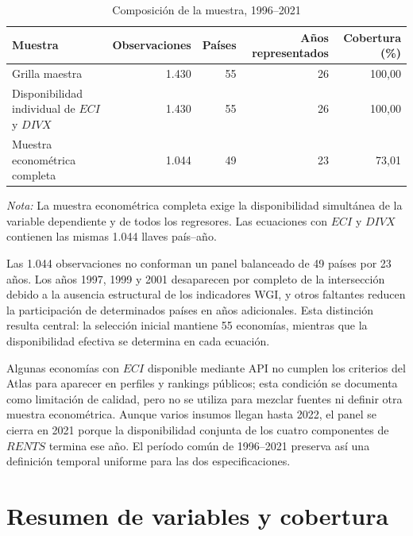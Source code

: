 \documentclass[../../TFM.tex]{subfiles}
\begin{document}
	\begin{table}[htbp]
		\centering
		\caption{Composición de la muestra, 1996--2021}
		\label{tab:composicion-muestra-cap10}
		\begin{minipage}{0.94\textwidth}
			\small
			\begin{tabularx}{\linewidth}{@{}Xrrrr@{}}
				\toprule
				Muestra
				& Observaciones
				& Países
				& Años representados
				& Cobertura (\%) \\
				\midrule
				Grilla maestra
				& 1.430 & 55 & 26 & 100,00 \\
				Disponibilidad individual de $ECI$ y $DIVX$
				& 1.430 & 55 & 26 & 100,00 \\
				Muestra econométrica completa
				& 1.044 & 49 & 23 & 73,01 \\
				\bottomrule
			\end{tabularx}
			\par\medskip
			\footnotesize
			\textit{Nota:} La muestra econométrica completa exige la
			disponibilidad simultánea de la variable dependiente y de todos los
			regresores. Las ecuaciones con $ECI$ y $DIVX$ contienen las mismas
			1.044 llaves país--año.
		\end{minipage}
	\end{table}

	Las 1.044 observaciones no conforman un panel balanceado de 49 países por 23
	años. Los años 1997, 1999 y 2001 desaparecen por completo de la intersección
	debido a la ausencia estructural de los indicadores WGI, y otros faltantes
	reducen la participación de determinados países en años adicionales. Esta
	distinción resulta central: la selección inicial mantiene 55 economías,
	mientras que la disponibilidad efectiva se determina en cada ecuación.

	Algunas economías con $ECI$ disponible mediante API no cumplen los criterios
	del Atlas para aparecer en perfiles y rankings públicos; esta condición se
	documenta como limitación de calidad, pero no se utiliza para mezclar
	fuentes ni definir otra muestra econométrica. Aunque varios insumos llegan
	hasta 2022, el panel se cierra en 2021 porque la disponibilidad conjunta de
	los cuatro componentes de $RENTS$ termina ese año. El período común de
	1996--2021 preserva así una definición temporal uniforme para las dos
	especificaciones.


	\section{Resumen de variables y cobertura}
	\label{sec:resumen-variables-cobertura}
\end{document}

